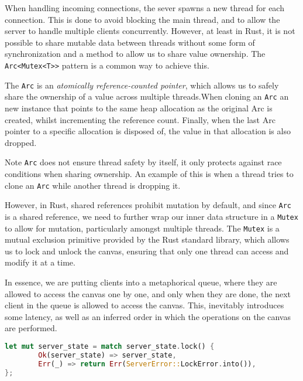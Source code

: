 \documentclass{article}
\newcommand{\code}[1]{\texttt{#1}}
\begin{document}
When handling incoming connections, the sever spawns a new thread for each
connection. This is done to avoid blocking the main thread, and to allow the
server to handle multiple clients concurrently. However, at least in Rust, it is
not possible to share mutable data between threads without some form of
synchronization and a method to allow us to share value ownership.  The
\code{Arc<Mutex<T>>} pattern is a common way to achieve this.

The \code{Arc} is an \textit{atomically reference-counted pointer}, which allows
us to safely share the ownership of a value across multiple threads.When cloning
an \code{Arc} an new instance that points to the same heap allocation as the
original Arc is created, whilst incrementing the reference count. Finally, when the last
Arc pointer to a specific allocation is disposed of, the value in that
allocation is also dropped.

\begin{mainbox}{Note}
    \code{Arc} does not ensure thread safety by itself, it only protects against
    race conditions when sharing ownership. An example of this is when a thread
    tries to clone an \code{Arc} while another thread is dropping it.
\end{mainbox}

However, in Rust, shared references prohibit mutation by default, and since
\code{Arc} is a shared reference, we need to further wrap our inner data
structure in a \code{Mutex} to allow for mutation, particularly amongst multiple
threads. The \code{Mutex} is a mutual exclusion primitive provided by the Rust
standard library, which allows us to lock and unlock the canvas, ensuring that
only one thread can access and modify it at a time.

In essence, we are putting clients into a metaphorical queue, where they are
allowed to access the canvas one by one, and only when they are done, the next
client in the queue is allowed to access the canvas. This, inevitably introduces
some latency, as well as an inferred order in which the operations on the canvas
are performed.

\begin{subbox}{}
    \lstset{xleftmargin=0\textwidth, xrightmargin=0\textwidth}
    \begin{lstlisting}[language=Rust]
let mut server_state = match server_state.lock() {
        Ok(server_state) => server_state,
        Err(_) => return Err(ServerError::LockError.into()),
};
    \end{lstlisting}
\end{subbox}
\end{document}
